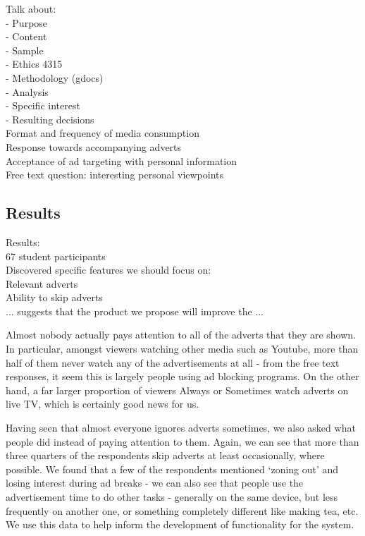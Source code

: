 Talk about:\\
 - Purpose\\
 - Content\\
 - Sample\\
 - Ethics 4315\\
 - Methodology (gdocs)\\
 - Analysis\\
  - Specific interest\\
  - Resulting decisions\\


Format and frequency of media consumption\\
Response towards accompanying adverts\\
Acceptance of ad targeting with personal information\\
Free text question: interesting personal viewpoints\\






\subsection{Results}

Results:\\
67 student participants\\
Discovered specific features we should focus on:\\
Relevant adverts\\
Ability to skip adverts\\
... suggests that the product we propose will improve the ...

Almost nobody actually pays attention to all of the adverts that they are shown. In particular, amongst viewers watching other media such as Youtube, more than half of them never watch any of the advertisements at all - from the free text responses, it seem this is largely people using ad blocking programs. On the other hand, a far larger proportion of viewers Always or Sometimes watch adverts on live TV, which is certainly good news for us.

Having seen that almost everyone ignores adverts sometimes, we also asked what people did instead of paying attention to them. Again, we can see that more than three quarters of the respondents skip adverts at least occasionally, where possible. We found that a few of the respondents mentioned `zoning out' and losing interest during ad breaks - we can also see that people use the advertisement time to do other tasks - generally on the same device, but less frequently on another one, or something completely different like making tea, etc. We use this data to help inform the development of functionality for the system.


